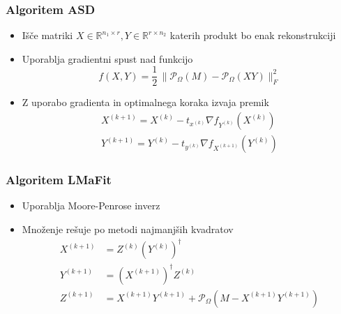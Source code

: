 \documentclass{beamer}
\newcommand{\fnorm}[1]{\lVert#1\rVert_F}
\newcommand{\proj}{\mathcal{P}_\Omega}
\begin{document}
\begin{frame}
  \frametitle{Algoritem ASD}
  \begin{itemize}
    \item Išče matriki $X \in \mathbb{R}^{n_1 \times r}, Y \in \mathbb{R}^{r \times n_2}$ katerih \alert{produkt} bo enak rekonstrukciji
    \item Uporablja \alert{gradientni spust} nad funkcijo \[
            f(X, Y) = \frac{1}{2}\, \fnorm{\proj(M) - \proj(XY)}^2
          \]
    \item Z uporabo \alert{gradienta} in \alert{optimalnega koraka} izvaja premik
          \begin{align*}
            X^{(k+1)} = X^{(k)} - t_{x^{(k)}} \nabla f_{Y^{(k)}}(X^{(k)}) \\
            Y^{(k+1)} = Y^{(k)} - t_{y^{(k)}} \nabla f_{X^{(k+1)}}(Y^{(k)})
          \end{align*}
  \end{itemize}
\end{frame}

\begin{frame}
  \frametitle{Algoritem LMaFit}
  \begin{itemize}
    \item Uporablja \alert{Moore-Penrose inverz}
    \item Množenje rešuje po \alert{metodi najmanjših kvadratov}
          \begin{align*}
            X^{(k+1)} & = Z^{(k)}(Y^{(k)})^\dagger                           \\
            Y^{(k+1)} & = (X^{(k+1)})^\dagger Z^{(k)}                        \\
            Z^{(k+1)} & = X^{(k+1)}Y^{(k+1)} + \proj(M - X^{(k+1)}Y^{(k+1)})
          \end{align*}
  \end{itemize}
\end{frame}
\end{document}
